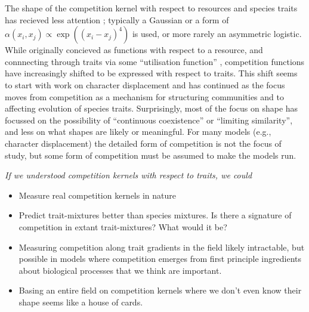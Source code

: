 \documentclass[a4paper,11pt]{article}
\begin{document}
%
The shape of the competition kernel with respect to resources and
species traits has recieved less attention \citep[but
see][]{Abrams-2008,Leimar-2013}; typically a Gaussian or a form of
$\alpha(x_i, x_j) \propto \exp((x_i - x_j)^4)$ is used, or more rarely
an asymmetric logistic.
%
While originally concieved as functions with respect to a resource,
and connnecting through traits via some ``utilisation function''
\citep{MacArthur-1967}, competition functions have increasingly
shifted to be expressed with respect to traits.
%
This shift seems to start with work on character displacement
\citep{Taper-1985} and has continued as the focus moves from
competition as a mechanism for structuring communities and to
affecting evolution of species traits.
%
Surprisingly, most of the focus on shape has focussed on the
possibility of ``continuous coexistence'' or ``limiting similarity'',
and less on what shapes are likely or meaningful.
For many models (e.g., character displacement) the detailed form of
competition is not the focus of study, but some form of competition
must be assumed to make the models run.
%


\textit{If we understood competition kernels with respect to traits,
  we could}
\begin{itemize}
\item Measure real competition kernels in nature
\item Predict trait-mixtures better than species mixtures.  Is there a
  signature of competition in extant trait-mixtures?  What would it
  be?
\item Measuring competition along trait gradients in the field likely
  intractable, but possible in models where competition emerges from
  first principle ingredients about biological processes that we think
  are important.
\item Basing an entire field on competition kernels where we don't
  even know their shape seems like a house of cards.
\end{itemize}
\end{document}
